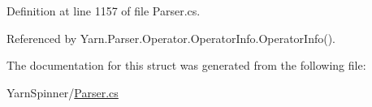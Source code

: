 Definition at line 1157 of file Parser.\-cs.



Referenced by Yarn.\-Parser.\-Operator.\-Operator\-Info.\-Operator\-Info().



The documentation for this struct was generated from the following file\-:\begin{DoxyCompactItemize}
\item 
Yarn\-Spinner/\hyperlink{a00313}{Parser.\-cs}\end{DoxyCompactItemize}
